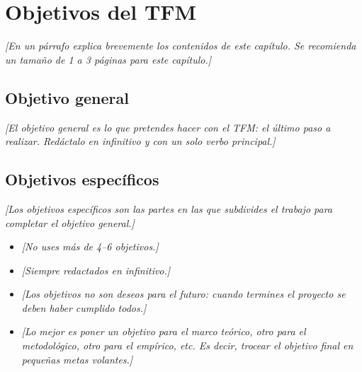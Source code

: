 
\chapter{Objetivos del TFM}

\label{Chapter2}


\textit{[En un párrafo explica brevemente los contenidos de este capítulo. Se recomienda un tamaño de 1 a 3 páginas para este capítulo.]}


\section{Objetivo general}

\textit{[El objetivo general es lo que pretendes hacer con el TFM: el último paso a realizar. Redáctalo en infinitivo y con un solo verbo principal.]}


\section{Objetivos específicos}

\textit{[Los objetivos específicos son las partes en las que subdivides el trabajo para completar el objetivo general.]}

\begin{itemize}
    \item \textit{[No uses más de 4--6 objetivos.]}
    \item \textit{[Siempre redactados en infinitivo.]}
    \item \textit{[Los objetivos no son deseos para el futuro: cuando termines el proyecto se deben haber cumplido todos.]}
    \item \textit{[Lo mejor es poner un objetivo para el marco teórico, otro para el metodológico, otro para el empírico, etc. Es decir, trocear el objetivo final en pequeñas metas volantes.]}
\end{itemize}
